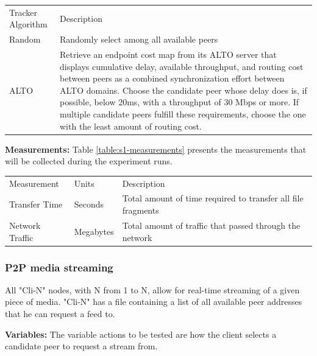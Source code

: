 \begin{table}[]
\begin{tabular}{ll}
Tracker Algorithm & Description                                                                                                                                                                                                \\
Random            & Randomly select among all available peers                                                                                                                                                                  \\
ALTO              & Retrieve an endpoint cost map from its ALTO server that displays cumulative delay, available throughput, and routing cost between peers as a combined synchronization effort between ALTO domains.
Choose the candidate peer whose delay does is, if possible, below 20ms, with a throughput of 30 Mbps or more.
If multiple candidate peers fulfill these requirements, choose the one with the least amount of routing cost.
\end{tabular}
\end{table}

    \textbf{Measurements:} Table \ref{table:s1-measurements} presents the measurements that will be collected during the experiment runs.

\begin{table}[]
\begin{tabular}{lll}
Measurement     & Units     & Description                                                  \\
Transfer Time   & Seconds   & Total amount of time required to transfer all file fragments \\
Network Traffic & Megabytes & Total amount of traffic that passed through the network
\end{tabular}
\end{table}

\subsubsection{P2P media streaming}

     All "Cli-N" nodes, with N from 1 to N, allow for real-time streaming of a given piece of media.
"Cli-N" has a file containing a list of all available peer addresses that he can request a feed to.

    \textbf{Variables: } The variable actions to be tested are how the client selects a candidate peer to request a stream from.

